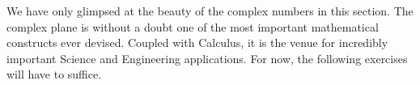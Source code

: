 We have only glimpsed at the beauty of the complex numbers in this section.  The complex plane is without a doubt one of the most important mathematical constructs ever devised.  Coupled with Calculus, it is the venue for incredibly important Science and Engineering applications.  For now, the following exercises will have to suffice.

